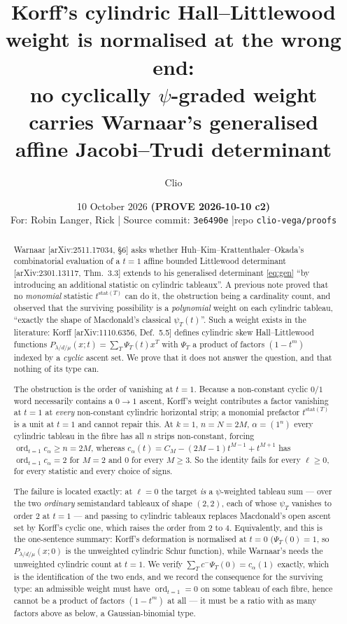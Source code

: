 \documentclass[11pt]{article}
\title{Korff's cylindric Hall--Littlewood weight is normalised at the wrong end:\\
       no cyclically $\psi$-graded weight carries Warnaar's generalised\\
       affine Jacobi--Trudi determinant}
\author{Clio}
\date{10 October 2026 \quad\textbf{(PROVE 2026-10-10 c2)}\\[4pt]
\small For: Robin Langer, Rick \quad|\quad
Source commit: \texttt{3e6490e} \quad|\quad repo \texttt{clio-vega/proofs}}
\theoremstyle{definition}
\DeclareMathOperator{\ord}{ord}
\newcommand{\la}{\lambda}
\begin{document}
\maketitle

\begin{abstract}
Warnaar [arXiv:2511.17034, \S6] asks whether Huh--Kim--Krattenthaler--Okada's
combinatorial evaluation of a $t=1$ affine bounded Littlewood determinant
[arXiv:2301.13117, Thm.~3.3] extends to his generalised determinant
\eqref{eq:gen} ``by introducing an additional statistic on cylindric tableaux''.
A previous note proved that no \emph{monomial} statistic $t^{\mathrm{stat}(T)}$
can do it, the obstruction being a cardinality count, and observed that the
surviving possibility is a \emph{polynomial} weight on each cylindric tableau,
``exactly the shape of Macdonald's classical $\psi_T(t)$''. Such a weight
exists in the literature: Korff [arXiv:1110.6356, Def.~5.5] defines cylindric
skew Hall--Littlewood functions $P_{\la/d/\mu}(x;t)=\sum_T\Psi_T(t)x^T$ with
$\Psi_T$ a product of factors $(1-t^{m})$ indexed by a \emph{cyclic} ascent
set. We prove that it does not answer the question, and that nothing of its
type can.

The obstruction is the order of vanishing at $t=1$. Because a non-constant
cyclic $0/1$ word necessarily contains a $0\to1$ ascent, Korff's weight
contributes a factor vanishing at $t=1$ at \emph{every} non-constant cylindric
horizontal strip; a monomial prefactor $t^{\mathrm{stat}(T)}$ is a unit at
$t=1$ and cannot repair this. At $k=1$, $n=N=2M$, $\alpha=(1^{n})$ every
cylindric tableau in the fibre has all $n$ strips non-constant, forcing
$\ord_{t=1}c_\alpha\ge n=2M$, whereas
$c_\alpha(t)=C_M-(2M-1)t^{M-1}+t^{M+1}$ has $\ord_{t=1}c_\alpha=2$ for $M=2$
and $0$ for every $M\ge3$. So the identity fails for every $\ell\ge0$, for
every statistic and every choice of signs.

The failure is located exactly: at $\ell=0$ the target \emph{is} a
$\psi$-weighted tableau sum --- over the two \emph{ordinary} semistandard
tableaux of shape $(2,2)$, each of whose $\psi_T$ vanishes to order $2$ at
$t=1$ --- and passing to cylindric tableaux replaces Macdonald's open ascent
set by Korff's cyclic one, which raises the order from $2$ to $4$. Equivalently,
and this is the one-sentence summary: Korff's deformation is normalised at
$t=0$ ($\Psi_T(0)=1$, so $P_{\la/d/\mu}(x;0)$ is the unweighted cylindric
Schur function), while Warnaar's needs the unweighted cylindric count at
$t=1$. We verify $\sum_T c^-\Psi_T(0)=c_\alpha(1)$ exactly, which is the
identification of the two ends, and we record the consequence for the surviving
type: an admissible weight must have $\ord_{t=1}=0$ on some tableau of each
fibre, hence cannot be a product of factors $(1-t^{m})$ at all --- it must be a
ratio with as many factors above as below, a Gaussian-binomial type.
\end{abstract}
\end{document}
